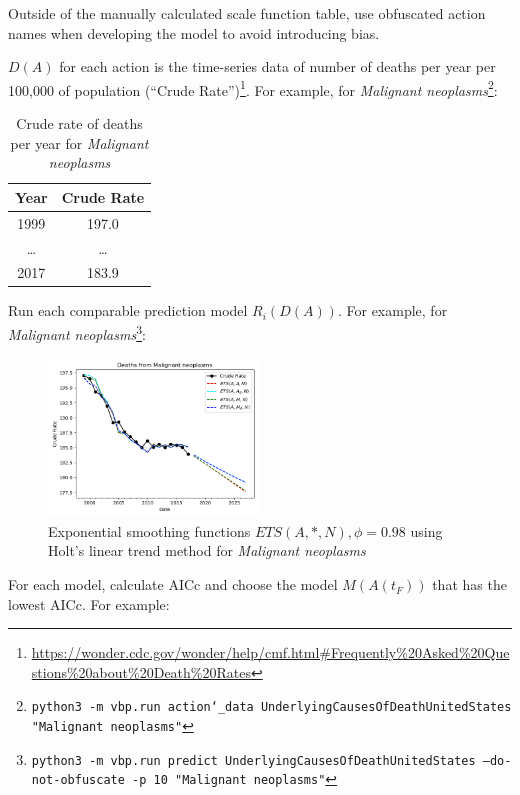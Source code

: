 \documentclass[12pt, a4paper, twocolumn]{article}
\begin{document}
Outside of the manually calculated scale function table, use obfuscated action names when developing the model to avoid introducing bias.

$D(A)$ for each action is the time-series data of number of deaths per year per 100,000 of population (\enquote{Crude Rate})\footnote{\url{https://wonder.cdc.gov/wonder/help/cmf.html\#Frequently\%20Asked\%20Questions\%20about\%20Death\%20Rates}}. For example, for \textit{Malignant neoplasms}\footnote{\texttt{python3 -m vbp.run action\char`_data UnderlyingCausesOfDeathUnitedStates "Malignant neoplasms"}}:

\begin{table}[H]
  \centering
  \begin{tabular}{cc}
    \toprule
      Year   & Crude Rate \\
    \midrule
      1999   &      197.0 \\
      \ldots &     \ldots \\
      2017   &      183.9 \\
    \bottomrule
  \end{tabular}
  \caption{Crude rate of deaths per year for \textit{Malignant neoplasms}}
  \label{table:daa1}
\end{table}

Run each comparable prediction model $R_i(D(A))$. For example, for \textit{Malignant neoplasms}\footnote{\texttt{python3 -m vbp.run predict UnderlyingCausesOfDeathUnitedStates --do-not-obfuscate -p 10 "Malignant neoplasms"}}:

\begin{figure}[H]
  \centering
  \includegraphics[width=0.5\textwidth]{Malignant_neoplasms_ets.png}
  \caption{Exponential smoothing functions $ETS(A,*,N),\phi=0.98$ using Holt's linear trend method for \textit{Malignant neoplasms}}\label{fig:neoplasmregs}
\end{figure}

For each model, calculate AICc and choose the model $M(A(t_F))$ that has the lowest AICc. For example:
\end{document}
